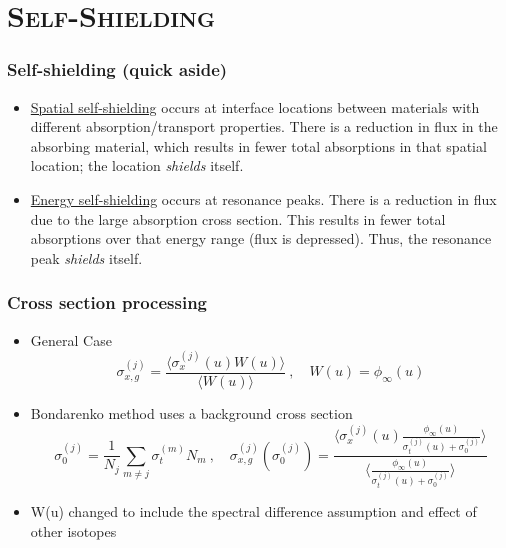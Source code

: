 \documentclass[xcolor=x11names,compress, handout]{beamer}
\renewcommand{\(}{\begin{columns}}
\renewcommand{\)}{\end{columns}}
\newcommand{\<}[1]{\begin{column}{#1}}
\renewcommand{\>}{\end{column}}
\newcommand{\micro}{\ensuremath{\sigma}}
\begin{document}
\section{\scshape Self-Shielding}
\begin{frame}[fragile]
  \frametitle{Self-shielding (quick aside)}

	\begin{itemize}
	\item \underline{Spatial self-shielding} occurs at interface locations between materials with different absorption/transport properties. There is a reduction in flux in the absorbing material, which results in fewer total absorptions in that spatial location; the location \textit{shields} itself. \vspace*{1em}
	
	\item \underline{Energy self-shielding} occurs at resonance peaks. There is a reduction in flux due to the large absorption cross section. This results in fewer total absorptions over that energy range (flux is depressed). Thus, the resonance peak \textit{shields} itself.
	\end{itemize}

\end{frame}


\begin{frame}[fragile]
  \frametitle{Cross section processing \cite{Bondarenko1964}}

	\begin{itemize}
	\item General Case
	\begin{equation}
  	\micro_{x,g}^{(j)} = \frac{\langle \micro_x^{(j)}(u) W(u)\rangle}
	{\langle W(u)\rangle} \:, \quad W(u) = \phi_{\infty}(u) \nonumber
 	 \label{eq:baseBondarenko}
 	\end{equation} 
 	
 	\pause
 	\item Bondarenko method uses a background cross section
 	\begin{equation}
  	\micro_0^{(j)} = \frac{1}{N_j} \sum_{m \ne j} \micro_{t}^{(m)} N_m 
  	\:, \quad \micro_{x,g}^{(j)}(\micro_0^{(j)}) = \frac{\langle
  	 \micro_{x}^{(j)}(u) \frac{\phi_{\infty}(u)} {\micro_{t}^{(j)}(u)
  	 + \micro_0^{(j)}} \rangle}
  	 { \langle \frac{\phi_{\infty}(u)}{\micro_{t}^{(j)}(u) +
  	 \micro_0^{(j)}}\rangle} \nonumber
  \label{eq:ssfact}
	\end{equation}
	\item W(u) changed to include the  spectral difference assumption and effect of other isotopes
	\end{itemize}
	
\end{frame}
	
\end{document}
